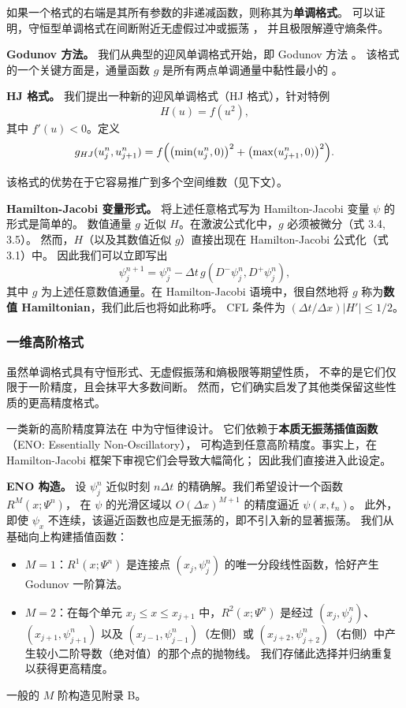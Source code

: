 \documentclass[11pt,a4paper]{article}
\begin{document}
如果一个格式的右端是其所有参数的非递减函数，则称其为\textbf{单调格式}。
可以证明，守恒型单调格式在间断附近无虚假过冲或振荡 \cite{kutnetsov1977}，
并且极限解遵守熵条件。

\textbf{Godunov 方法。}
我们从典型的迎风单调格式开始，即 Godunov 方法 \cite{godunov1959}。
该格式的一个关键方面是，通量函数 $g$ 是所有两点单调通量中黏性最小的 \cite{osher1984}。

\textbf{HJ 格式。}
我们提出一种新的迎风单调格式（HJ 格式），针对特例
\begin{equation}
H(u) = f(u^2),
\end{equation}
其中 $f'(u) < 0$。定义
\begin{equation}
g_{HJ}(u_j^n, u_{j+1}^n) = f\Bigl(\bigl(\min(u_j^n, 0)\bigr)^2 + \bigl(\max(u_{j+1}^n, 0)\bigr)^2\Bigr).
\label{eq:3.7}
\end{equation}

该格式的优势在于它容易推广到多个空间维数（见下文）。

\textbf{Hamilton-Jacobi 变量形式。}
将上述任意格式写为 Hamilton-Jacobi 变量 $\psi$ 的形式是简单的。
数值通量 $g$ 近似 $H$。在激波公式化中，$g$ 必须被微分（式 3.4, 3.5）。
然而，$H$（以及其数值近似 $g$）直接出现在 Hamilton-Jacobi 公式化（式 3.1）中。
因此我们可以立即写出
\begin{equation}
\psi_j^{n+1} = \psi_j^n - \Delta t\,g(D^-\psi_j^n, D^+\psi_j^n),
\label{eq:3.8}
\end{equation}
其中 $g$ 为上述任意数值通量。在 Hamilton-Jacobi 语境中，很自然地将 $g$ 称为\textbf{数值 Hamiltonian}，我们此后也将如此称呼。
CFL 条件为 $(\Delta t/\Delta x)|H'| \leq 1/2$。

\subsubsection{一维高阶格式}

虽然单调格式具有守恒形式、无虚假振荡和熵极限等期望性质，
不幸的是它们仅限于一阶精度，且会抹平大多数间断。
然而，它们确实启发了其他类保留这些性质的更高精度格式。

一类新的高阶精度算法在 \cite{harten1987, harten1986} 中为守恒律设计。
它们依赖于\textbf{本质无振荡插值函数}（ENO: Essentially Non-Oscillatory），
可构造到任意高阶精度。事实上，在 Hamilton-Jacobi 框架下审视它们会导致大幅简化；
因此我们直接进入此设定。

\textbf{ENO 构造。}
设 $\psi_j^n$ 近似时刻 $n\Delta t$ 的精确解。我们希望设计一个函数 $R^M(x; \Psi^n)$，
在 $\psi$ 的光滑区域以 $O(\Delta x)^{M+1}$ 的精度逼近 $\psi(x, t_n)$。
此外，即使 $\psi_x$ 不连续，该逼近函数也应是无振荡的，即不引入新的显著振荡。
我们从基础向上构建插值函数：
\begin{itemize}
    \item $M=1$：$R^1(x; \Psi^n)$ 是连接点 $(x_j, \psi_j^n)$ 的唯一分段线性函数，恰好产生 Godunov 一阶算法。
    \item $M=2$：在每个单元 $x_j \leq x \leq x_{j+1}$ 中，$R^2(x; \Psi^n)$ 是经过 $(x_j, \psi_j^n)$、$(x_{j+1}, \psi_{j+1}^n)$ 以及
          $(x_{j-1}, \psi_{j-1}^n)$（左侧）或 $(x_{j+2}, \psi_{j+2}^n)$（右侧）中产生较小二阶导数（绝对值）的那个点的抛物线。
          我们存储此选择并归纳重复以获得更高精度。
\end{itemize}
一般的 $M$ 阶构造见附录 B。
\end{document}
